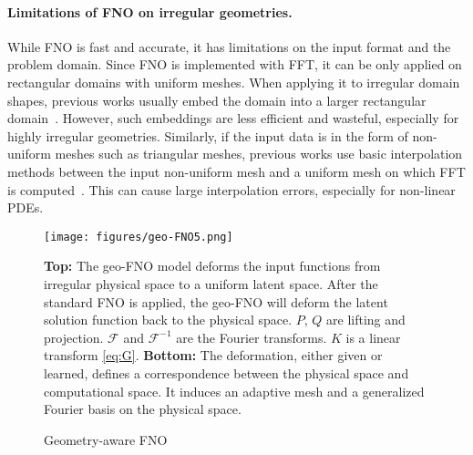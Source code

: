 \documentclass{article}
\newcommand{\F}{\mathcal{F}}
\begin{document}
\paragraph{Limitations of FNO on irregular geometries.}
While FNO is fast and accurate, it has limitations on the input format and the problem domain. Since FNO is implemented with FFT, it can be only applied on rectangular domains with uniform meshes.  When applying it to irregular domain shapes, previous works usually embed the domain into a larger rectangular domain~\citep{lu2022comprehensive}. However, such embeddings are less efficient and wasteful, especially for highly irregular geometries.
Similarly, if the input data is in the form of non-uniform meshes such as triangular meshes,   previous works use basic interpolation methods between the input non-uniform mesh and a uniform mesh on which FFT is computed~\cite{li2020fourier}. This can cause large interpolation errors, especially for non-linear PDEs. 


\begin{figure}
    \centering
    \texttt{[image: figures/geo-FNO5.png]}
    \caption{Geometry-aware FNO}
    \label{fig:GFNO}
    {\small  
    \textbf{Top:}  The geo-FNO model deforms the input functions from irregular physical space to a uniform latent space. After the standard FNO \cite{li2020fourier} is applied, the geo-FNO will deform the latent solution function back to the physical space. $P$, $Q$ are lifting and projection. $\F$ and $\F^{-1}$ are the Fourier transforms. $K$ is a linear transform  \eqref{eq:G}. 
    \textbf{Bottom:} The deformation, either given or learned,  defines a correspondence between the physical space and computational space. It induces an adaptive mesh and a generalized Fourier basis on the physical space.} 
\end{figure}
\end{document}
